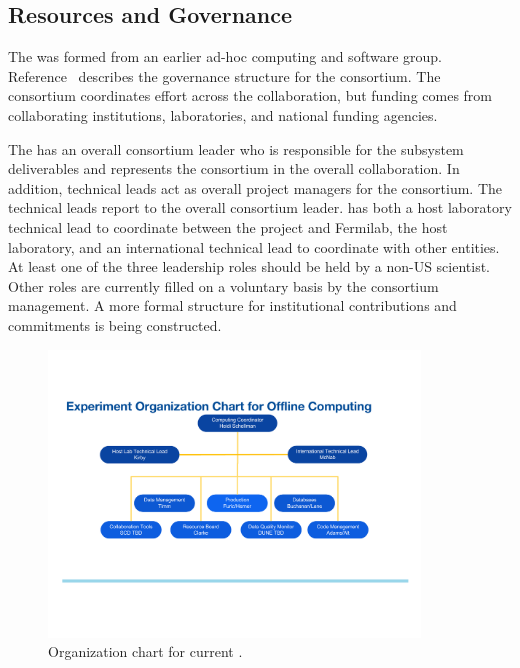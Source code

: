 \subsection{Resources and Governance}
\label{ch:exec-comp-gov}

The  was formed from an earlier ad-hoc  computing and software group. %
Reference~\cite{bib:docdb12751} describes the governance structure for the consortium.  The consortium coordinates effort across the collaboration, but funding comes from collaborating institutions, laboratories, and national funding agencies. %

The %
 has an overall consortium leader %
who is responsible for the subsystem deliverables and represents the consortium in the overall  collaboration.
In addition, technical leads act as overall project managers for the consortium. The technical leads report to the overall consortium leader.
 has both a host laboratory technical lead to coordinate between the  project and Fermilab, the host laboratory, and an international  technical lead to coordinate with other entities.
At least one of the three leadership roles should be held by a non-US scientist. 
Other roles are currently filled on a voluntary basis by the consortium management.  A more formal structure for institutional contributions and commitments is being constructed. 


\begin{figure}[htp]
\centering
\includegraphics[height=3in]{graphics/comp_Org_Chart.pdf}
\caption[Organization chart for current ]{Organization chart for current . }
\label{fig:ch-exec-comp-org-es}
\end{figure}

